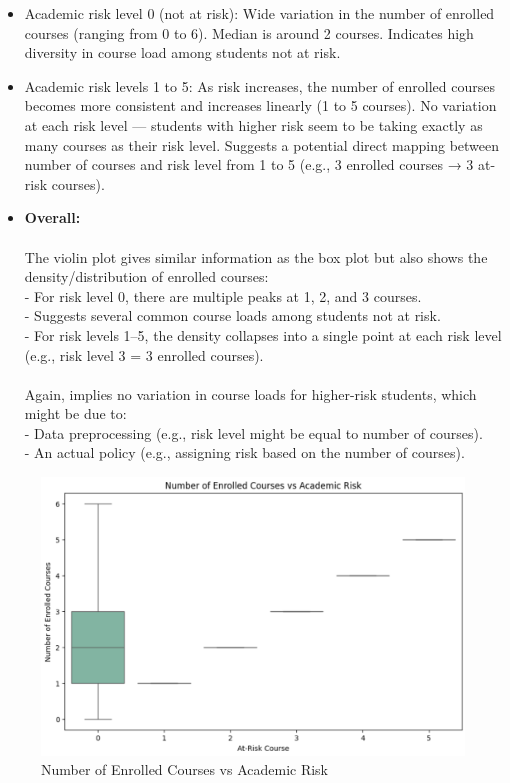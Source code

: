 \documentclass[12pt]{article}
\begin{document}
\begin{itemize}
    \item Academic risk level 0 (not at risk): Wide variation in the number of enrolled courses (ranging from 0 to 6). Median is around 2 courses. Indicates high diversity in course load among students not at risk.

    \item Academic risk levels 1 to 5: As risk increases, the number of enrolled courses becomes more consistent and increases linearly (1 to 5 courses). No variation at each risk level — students with higher risk seem to be taking exactly as many courses as their risk level. Suggests a potential direct mapping between number of courses and risk level from 1 to 5 (e.g., 3 enrolled courses → 3 at-risk courses).

    \item \textbf{Overall: }\\ \\
     The violin plot gives similar information as the box plot but also shows the density/distribution of enrolled courses:\\
    - For risk level 0, there are multiple peaks at 1, 2, and 3 courses.\\
    - Suggests several common course loads among students not at risk.\\
    - For risk levels 1–5, the density collapses into a single point at each risk level (e.g., risk level 3 = 3 enrolled courses).\\ \\
     Again, implies no variation in course loads for higher-risk students, which might be due to:\\
    - Data preprocessing (e.g., risk level might be equal to number of courses).\\
    - An actual policy (e.g., assigning risk based on the number of courses).
\end{itemize}

\begin{figure}[H]
    \centering
    \includegraphics[width=1\linewidth]{boxplot_academic_risk.png}
    \caption{Number of Enrolled Courses vs Academic Risk}
\end{figure}
\end{document}
